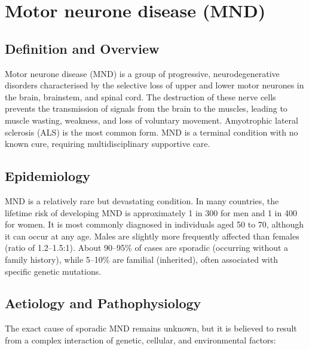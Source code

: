 \chapter{Motor neurone disease (MND)}

\section*{Definition and Overview}
Motor neurone disease (MND) is a group of progressive, neurodegenerative disorders characterised by the selective loss of upper and lower motor neurones in the brain, brainstem, and spinal cord. The destruction of these nerve cells prevents the transmission of signals from the brain to the muscles, leading to muscle wasting, weakness, and loss of voluntary movement. Amyotrophic lateral sclerosis (ALS) is the most common form. MND is a terminal condition with no known cure, requiring multidisciplinary supportive care.

\section*{Epidemiology}
MND is a relatively rare but devastating condition. In many countries, the lifetime risk of developing MND is approximately 1 in 300 for men and 1 in 400 for women. It is most commonly diagnosed in individuals aged 50 to 70, although it can occur at any age. Males are slightly more frequently affected than females (ratio of 1.2--1.5:1). About 90--95\% of cases are sporadic (occurring without a family history), while 5--10\% are familial (inherited), often associated with specific genetic mutations.

\section*{Aetiology and Pathophysiology}
The exact cause of sporadic MND remains unknown, but it is believed to result from a complex interaction of genetic, cellular, and environmental factors:

